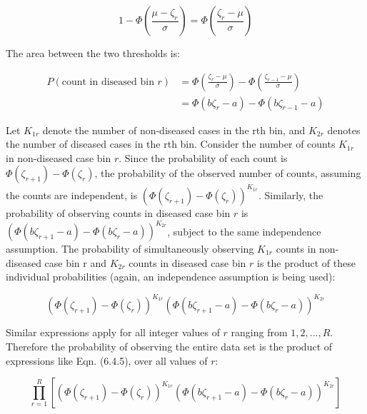 \documentclass[
]{book}
\begin{document}
\begin{equation*} 
1 - \Phi\left ( \frac{\mu-\zeta_r}{\sigma} \right ) = \Phi\left ( \frac{\zeta_r - \mu}{\sigma} \right )
\end{equation*}

The area between the two thresholds is:

\begin{align*} 
P\left ( \text{count in diseased bin }r \right ) &= \Phi\left ( \frac{\zeta_r - \mu}{\sigma} \right ) - \Phi\left ( \frac{\zeta_{r-1} - \mu}{\sigma} \right ) \\
&= \Phi\left ( b\zeta_r-a \right ) - \Phi\left ( b\zeta_{r-1}-a \right )
\end{align*}

Let \(K_{1r}\) denote the number of non-diseased cases in the rth bin, and \(K_{2r}\) denotes the number of diseased cases in the rth bin. Consider the number of counts \(K_{1r}\) in non-diseased case bin \(r\). Since the probability of each count is \(\Phi\left ( \zeta_{r+1} \right ) - \Phi\left ( \zeta_r \right )\), the probability of the observed number of counts, assuming the counts are independent, is \({\left(\Phi\left ( \zeta_{r+1} \right ) - \Phi\left ( \zeta_r \right ) \right )}^{K_{1r}}\). Similarly, the probability of observing counts in diseased case bin \(r\) is \({\left (\Phi\left ( b\zeta_{r+1}-a \right ) - \Phi\left ( b\zeta_r-a \right ) \right )}^{K_{2r}}\), subject to the same independence assumption. The probability of simultaneously observing \(K_{1r}\) counts in non-diseased case bin r and \(K_{2r}\) counts in diseased case bin \(r\) is the product of these individual probabilities (again, an independence assumption is being used):

\begin{equation*} 
\left (\Phi\left ( \zeta_{r+1}  \right ) - \Phi\left ( \zeta_r  \right )  \right )^{K_{1r}} \left (\Phi\left ( b\zeta_{r+1}-a  \right ) - \Phi\left ( b\zeta_r-a  \right )  \right )^{K_{2r}}
\end{equation*}

Similar expressions apply for all integer values of \(r\) ranging from \(1,2,...,R\). Therefore the probability of observing the entire data set is the product of expressions like Eqn. (6.4.5), over all values of \(r\):

\begin{equation} 
\prod_{r=1}^{R}\left [\left (\Phi\left ( \zeta_{r+1}  \right ) - \Phi\left ( \zeta_r  \right )  \right )^{K_{1r}} \left (\Phi\left ( b\zeta_{r+1}-a  \right ) - \Phi\left ( b\zeta_r-a  \right )  \right )^{K_{2r}}  \right ]
\label{eq:binormal-modelProductProb}
\end{equation}
\end{document}
